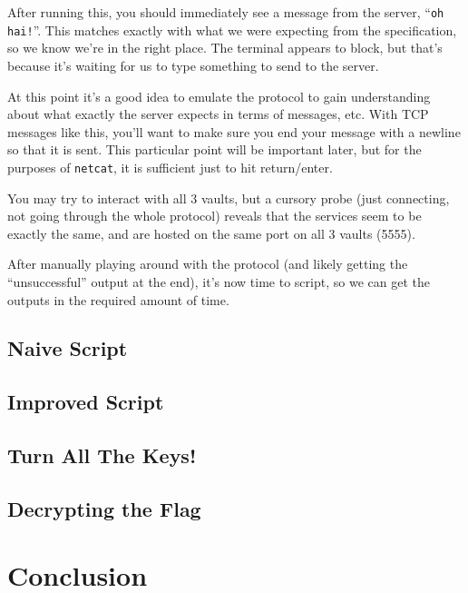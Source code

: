 \documentclass[11pt]{article}
\begin{document}
    After running this, you should immediately see a message from the server, ``\verb`oh hai!`''. This matches exactly with what we were expecting from the specification, so we know we're in the right place. The terminal appears to block, but that's because it's waiting for us to type something to send to the server.

    At this point it's a good idea to emulate the protocol to gain understanding about what exactly the server expects in terms of messages, etc. With TCP messages like this, you'll want to make sure you end your message with a newline so that it is sent. This particular point will be important later, but for the purposes of \verb`netcat`, it is sufficient just to hit return/enter.

    You may try to interact with all 3 vaults, but a cursory probe (just connecting, not going through the whole protocol) reveals that the services seem to be exactly the same, and are hosted on the same port on all 3 vaults (5555).

    \bigskip

    After manually playing around with the protocol (and likely getting the ``unsuccessful'' output at the end), it's now time to script, so we can get the outputs in the required amount of time.

    \subsection{Naive Script}\label{subsec:naive-script}

    \subsection{Improved Script}\label{subsec:improved-script}

    \subsection{Turn All The Keys!}\label{subsec:turn-all-the-keys}

    \subsection{Decrypting the Flag}\label{subsec:decrypting-the-flag}





    \section{Conclusion}\label{sec:conclusion}
\end{document}
